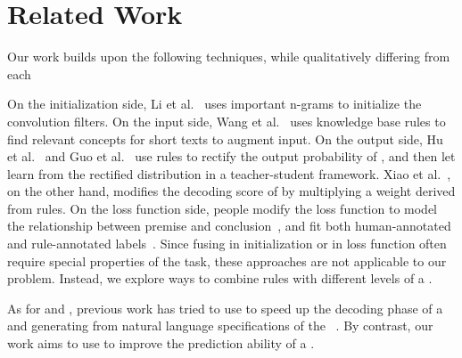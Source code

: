 \section{Related Work}
Our work builds upon the following techniques, while qualitatively differing from each

On the initialization side, Li et al.~ uses important n-grams to initialize the convolution filters.
On the input side, Wang et al.~ uses knowledge base rules to find relevant concepts for short texts to augment input.
On the output side,
Hu et al.~ and Guo et al.~ use \FOL rules to rectify the output probability of \NN, and then let \NN learn from the rectified distribution in a teacher-student framework.
Xiao et al.~, on the other hand, modifies the decoding score of \NN by multiplying a weight derived from rules.
On the loss function side, people modify the loss function to model the relationship between premise and conclusion~\cite{demeester2016lifted}, and fit both human-annotated and rule-annotated labels~\cite{alashkar2017examples}.
Since fusing in initialization or in loss function often require special properties of the task, these approaches are not applicable to our
problem. Instead, we explore ways to combine \RE rules with different levels of a \NN.

 As for \NNs and \REs, previous work has tried to use \RE to speed up the decoding phase of a
\NN~\cite{strauss2016regular} and generating \REs from natural language specifications of the \RE~\cite{locascio2016neural}. By contrast,
our work aims to use \REs to improve the prediction ability of a \NN.


